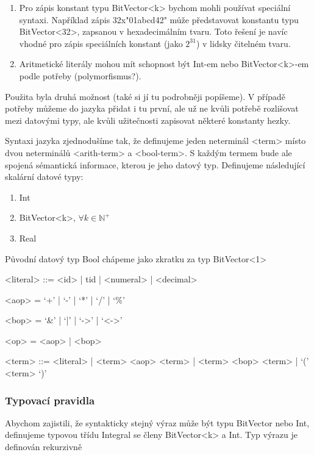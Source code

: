 \documentclass[10pt,a4paper,notitlepage]{report}
\begin{document}
\begin{enumerate}

\item Pro zápis konstant typu BitVector<k> bychom mohli používat speciální syntaxi. Například zápis 32x"01abcd42" může představovat konstantu typu BitVector<32>, zapsanou v hexadecimálním tvaru. Toto řešení je navíc vhodné pro zápis speciálních konstant (jako $2^{31}$) v lidsky čitelném tvaru. 

\item Aritmetické literály mohou mít schopnost být Int-em nebo BitVector<k>-em podle potřeby (polymorfismus?).

\end{enumerate}

Použita byla druhá možnost (také si jí tu podrobněji popíšeme). V případě potřeby můžeme do jazyka přidat i tu první, ale už ne kvůli potřebě rozlišovat mezi datovými typy, ale kvůli užitečnosti zapisovat některé konstanty hezky.

Syntaxi jazyka zjednodušíme tak, že definujeme jeden neterminál <term> místo dvou neterminálů <arith-term> a <bool-term>. S každým termem bude ale spojená sémantická informace, kterou je jeho datový typ. Definujeme následující skalární datové typy:

\begin{enumerate}
\item Int
\item BitVector<k>, $\forall k \in \mathbb{N^+}$
\item Real
\end{enumerate}

Původní datový typ Bool chápeme jako zkratku za typ BitVector<1>

\begin{grammar}
<literal> ::= <id> | tid | <numeral> | <decimal>

<aop> = `+'  | `-' | `*' | `/' |  `\%'

<bop> = `&' | `|' | `->' | `<->'

<op> = <aop> | <bop>

<term> ::= <literal> | <term> <aop> <term> | <term> <bop> <term> | `(' <term> `)'
\end{grammar}

\subsubsection{Typovací pravidla}
Abychom zajistili, že syntakticky stejný výraz může být typu BitVector nebo Int, definujeme typovou třídu Integral se členy BitVector<k> a Int. Typ výrazu je definován rekurzivně
\end{document}
